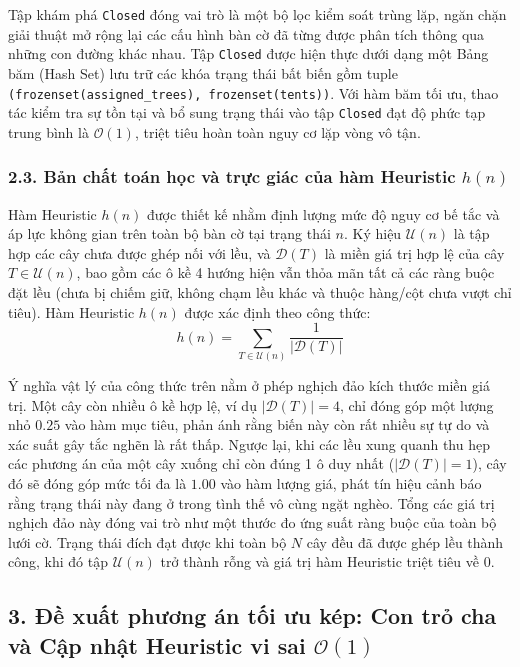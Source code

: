 \documentclass[a4paper,12pt]{article}
\begin{document}
Tập khám phá \texttt{Closed} đóng vai trò là một bộ lọc kiểm soát trùng lặp, ngăn chặn giải thuật mở rộng lại các cấu hình bàn cờ đã từng được phân tích thông qua những con đường khác nhau. Tập \texttt{Closed} được hiện thực dưới dạng một Bảng băm (Hash Set) lưu trữ các khóa trạng thái bất biến gồm tuple \texttt{(frozenset(assigned\_trees), frozenset(tents))}. Với hàm băm tối ưu, thao tác kiểm tra sự tồn tại và bổ sung trạng thái vào tập \texttt{Closed} đạt độ phức tạp trung bình là $\mathcal{O}(1)$, triệt tiêu hoàn toàn nguy cơ lặp vòng vô tận.

\subsubsection*{2.3. Bản chất toán học và trực giác của hàm Heuristic $h(n)$}
Hàm Heuristic $h(n)$ được thiết kế nhằm định lượng mức độ nguy cơ bế tắc và áp lực không gian trên toàn bộ bàn cờ tại trạng thái $n$. Ký hiệu $\mathcal{U}(n)$ là tập hợp các cây chưa được ghép nối với lều, và $\mathcal{D}(T)$ là miền giá trị hợp lệ của cây $T \in \mathcal{U}(n)$, bao gồm các ô kề 4 hướng hiện vẫn thỏa mãn tất cả các ràng buộc đặt lều (chưa bị chiếm giữ, không chạm lều khác và thuộc hàng/cột chưa vượt chỉ tiêu). Hàm Heuristic $h(n)$ được xác định theo công thức:
\begin{equation}
    h(n) = \sum_{T \in \mathcal{U}(n)} \frac{1}{|\mathcal{D}(T)|}
\end{equation}

Ý nghĩa vật lý của công thức trên nằm ở phép nghịch đảo kích thước miền giá trị. Một cây còn nhiều ô kề hợp lệ, ví dụ $|\mathcal{D}(T)| = 4$, chỉ đóng góp một lượng nhỏ $0.25$ vào hàm mục tiêu, phản ánh rằng biến này còn rất nhiều sự tự do và xác suất gây tắc nghẽn là rất thấp. Ngược lại, khi các lều xung quanh thu hẹp các phương án của một cây xuống chỉ còn đúng 1 ô duy nhất ($|\mathcal{D}(T)| = 1$), cây đó sẽ đóng góp mức tối đa là $1.00$ vào hàm lượng giá, phát tín hiệu cảnh báo rằng trạng thái này đang ở trong tình thế vô cùng ngặt nghèo. Tổng các giá trị nghịch đảo này đóng vai trò như một thước đo ứng suất ràng buộc của toàn bộ lưới cờ. Trạng thái đích đạt được khi toàn bộ $N$ cây đều đã được ghép lều thành công, khi đó tập $\mathcal{U}(n)$ trở thành rỗng và giá trị hàm Heuristic triệt tiêu về $0$.

\subsection*{3. Đề xuất phương án tối ưu kép: Con trỏ cha và Cập nhật Heuristic vi sai $\mathcal{O}(1)$}
\end{document}
